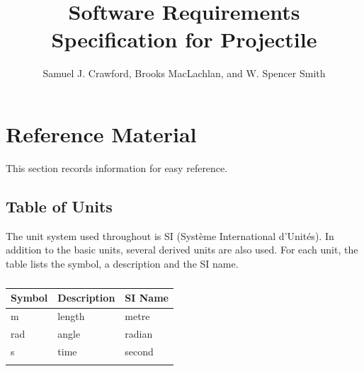 \documentclass[12pt]{article}
\title{Software Requirements Specification for Projectile}
\author{Samuel J. Crawford, Brooks MacLachlan, and W. Spencer Smith}
\begin{document}
\maketitle
\tableofcontents
\newpage
\section{Reference Material}
\label{Sec:RefMat}
This section records information for easy reference.
\subsection{Table of Units}
\label{Sec:ToU}
The unit system used throughout is SI (Système International d'Unités). In addition to the basic units, several derived units are also used. For each unit, the table lists the symbol, a description and the SI name.
\begin{longtable}{l l l}
\toprule
Symbol & Description & SI Name
\\
\midrule
\endhead
m & length & metre
\\
rad & angle & radian
\\
s & time & second
\\
\bottomrule
\caption{}
\label{Table:ToU}
\end{longtable}
\end{document}
